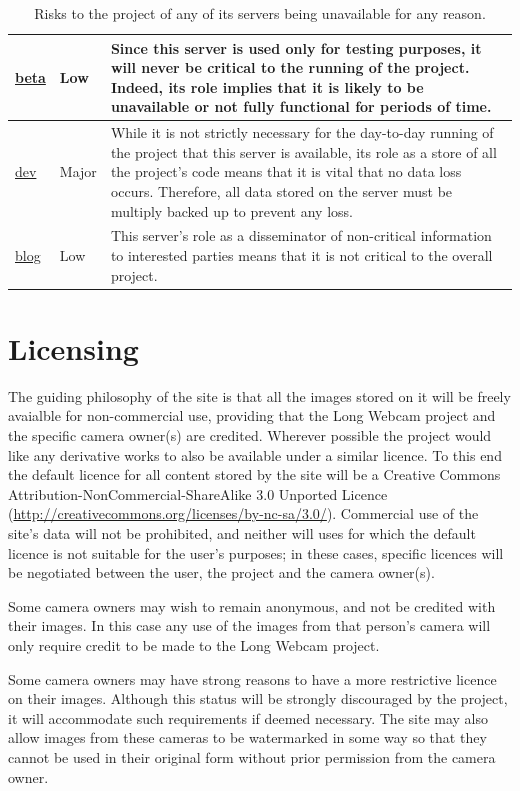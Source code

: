 \documentclass[11pt]{article}
\begin{document}
\begin{table}
\begin{tabular}{ | p{0.45in} | p{0.8in} | p{4.65in} | }
\hline
\url{beta} & Low & Since this server is used only for testing purposes, it will never be critical to the running of the project. Indeed, its role implies that it is likely to be unavailable or not fully functional for periods of time. \\
\hline
\url{dev} & Major & While it is not strictly necessary for the day-to-day running of the project that this server is available, its role as a store of all the project's code means that it is vital that no data loss occurs. Therefore, all data stored on the server must be multiply backed up to  prevent any loss. \\
\hline
\url{blog} & Low & This server's role as a disseminator of non-critical information to interested parties means that it is not critical to the overall project. \\
\hline
\end{tabular}
\caption{Risks to the project of any of its servers being unavailable for any reason.}
\label{tab:continuity}
\end{table}

\section{Licensing}
The guiding philosophy of the site is that all the images stored on it will be freely avaialble for non-commercial use, providing that the Long Webcam project and the specific camera owner(s) are credited. Wherever possible the project would like any derivative works to also be available under a similar licence. To this end the default licence for all content stored by the site will be a Creative Commons Attribution-NonCommercial-ShareAlike 3.0 Unported Licence (\url{http://creativecommons.org/licenses/by-nc-sa/3.0/}). Commercial use of the site's data will not be prohibited, and neither will uses for which the default licence is not suitable for the user's purposes; in these cases, specific licences will be negotiated between the user, the project and the camera owner(s).

Some camera owners may wish to remain anonymous, and not be credited with their images. In this case any use of the images from that person's camera will only require credit to be made to the Long Webcam project.

Some camera owners may have strong reasons to have a more restrictive licence on their images. Although this status will be strongly discouraged by the project, it will accommodate such requirements if deemed necessary. The site may also allow images from these cameras to be watermarked in some way so that they cannot be used in their original form without prior permission from the camera owner.
\end{document}
